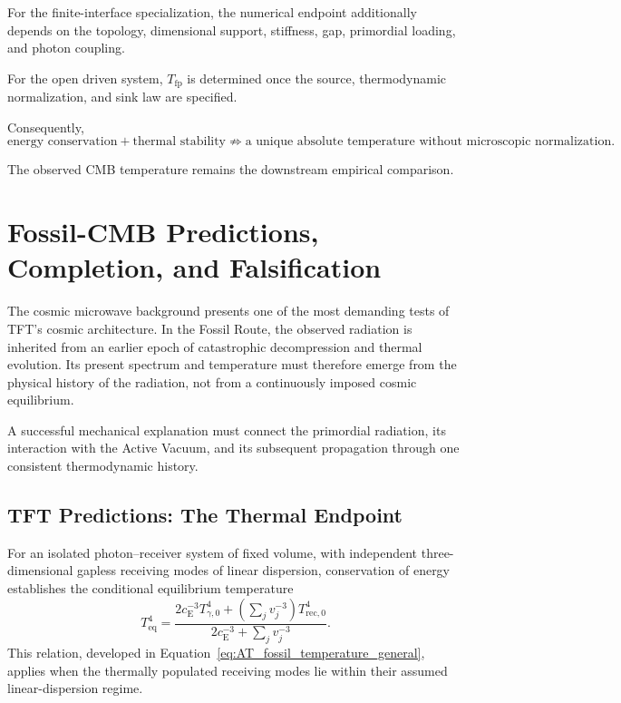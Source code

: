 For the finite-interface specialization, the numerical endpoint additionally
depends on the topology, dimensional support, stiffness, gap, primordial
loading, and photon coupling.

For the open driven system,
\(T_{\mathrm{fp}}\)
is determined once the source, thermodynamic normalization, and sink law are
specified.

Consequently,
\begin{equation}
    \text{energy conservation}
    +
    \text{thermal stability}
    \not\Rightarrow
    \text{a unique absolute temperature without microscopic normalization}.
    \label{eq:AT_constraint_absolute_temperature}
\end{equation}

The observed CMB temperature remains the downstream empirical comparison.


\section{Fossil-CMB Predictions, Completion, and Falsification}
\label{sec:AV_predictions_falsification}

The cosmic microwave background presents one of the most
demanding tests of TFT's cosmic architecture. In the Fossil
Route, the observed radiation is inherited from an earlier
epoch of catastrophic decompression and thermal evolution.
Its present spectrum and temperature must therefore emerge
from the physical history of the radiation, not from a
continuously imposed cosmic equilibrium.

A successful mechanical explanation must connect the
primordial radiation, its interaction with the Active Vacuum,
and its subsequent propagation through one consistent
thermodynamic history.

\subsection*{TFT Predictions: The Thermal Endpoint}

For an isolated photon--receiver system of fixed volume,
with independent three-dimensional gapless receiving modes
of linear dispersion, conservation of energy establishes
the conditional equilibrium temperature
%
\begin{equation}
T_{\mathrm{eq}}^4
=
\frac{
2c_{\mathrm E}^{-3}T_{\gamma,0}^4
+
\left(\sum_j v_j^{-3}\right)T_{\mathrm{rec},0}^4
}{
2c_{\mathrm E}^{-3}
+
\sum_j v_j^{-3}
}.
\end{equation}
%
This relation, developed in
Equation~\eqref{eq:AT_fossil_temperature_general},
applies when the thermally populated receiving modes
lie within their assumed linear-dispersion regime.


